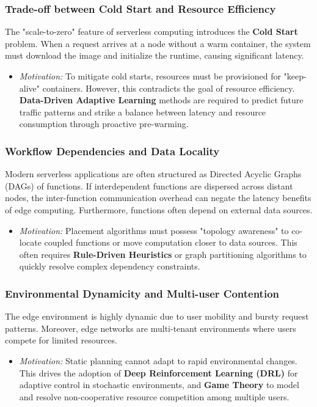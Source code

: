 \documentclass[lettersize,journal]{IEEEtran}
\begin{document}
\subsubsection{Trade-off between Cold Start and Resource Efficiency}
The "scale-to-zero" feature of serverless computing introduces the \textbf{Cold Start} problem. When a request arrives at a node without a warm container, the system must download the image and initialize the runtime, causing significant latency.
\begin{itemize}
    \item \textit{Motivation:} To mitigate cold starts, resources must be provisioned for "keep-alive" containers. However, this contradicts the goal of resource efficiency. \textbf{Data-Driven Adaptive Learning} methods are required to predict future traffic patterns and strike a balance between latency and resource consumption through proactive pre-warming.
\end{itemize}

\subsubsection{Workflow Dependencies and Data Locality}
Modern serverless applications are often structured as Directed Acyclic Graphs (DAGs) of functions. If interdependent functions are dispersed across distant nodes, the inter-function communication overhead can negate the latency benefits of edge computing. Furthermore, functions often depend on external data sources.
\begin{itemize}
    \item \textit{Motivation:} Placement algorithms must possess "topology awareness" to co-locate coupled functions or move computation closer to data sources. This often requires \textbf{Rule-Driven Heuristics} or graph partitioning algorithms to quickly resolve complex dependency constraints.
\end{itemize}

\subsubsection{Environmental Dynamicity and Multi-user Contention}
The edge environment is highly dynamic due to user mobility and bursty request patterns. Moreover, edge networks are multi-tenant environments where users compete for limited resources.
\begin{itemize}
    \item \textit{Motivation:} Static planning cannot adapt to rapid environmental changes. This drives the adoption of \textbf{Deep Reinforcement Learning (DRL)} for adaptive control in stochastic environments, and \textbf{Game Theory} to model and resolve non-cooperative resource competition among multiple users.
\end{itemize}
\end{document}

